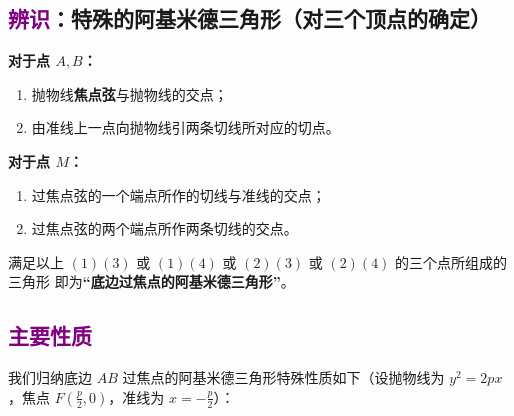 \documentclass{ctexart}
\begin{document}
	\subsection{\textcolor{purple}{辨识}：特殊的阿基米德三角形（对三个顶点的确定）}

	\textbf{对于点 $A,B$：}
	\begin{enumerate}
		\item[(1)] 抛物线\textbf{焦点弦}与抛物线的交点；
		\item[(2)] 由准线上一点向抛物线引两条切线所对应的切点。
	\end{enumerate}
	
	\textbf{对于点 $M$：}
	\begin{enumerate}
		\item[(3)] 过焦点弦的一个端点所作的切线与准线的交点；
		\item[(4)] 过焦点弦的两个端点所作两条切线的交点。
	\end{enumerate}
	
	满足以上 $(1)(3)$ 或 $(1)(4)$ 或 $(2)(3)$ 或 $(2)(4)$ 的三个点所组成的三角形
	即为\textbf{“底边过焦点的阿基米德三角形”}。
	


	
	\subsection{\textcolor{purple}{主要性质}}
	
	我们归纳底边 $AB$ 过焦点的阿基米德三角形特殊性质如下（设抛物线为 $y^2=2px$，焦点 $F\!\left(\frac p2,0\right)$，准线为 $x=-\frac p2$）：
	
\end{document}
